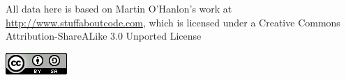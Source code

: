 \documentclass[twocolumn]{geocraft-worksheet}
\begin{document}
All data here is based on Martin O'Hanlon's work at
{\textcolor{greenish} {\url{http://www.stuffaboutcode.com}}}, which is
licensed under a Creative Commons Attribution-ShareALike 3.0 Unported
License \vspace{0.5cm}
\begin{center}
\includegraphics[scale=0.8]{creativecommons}
\end{center}
\end{document}
